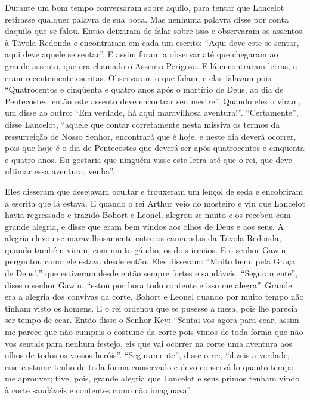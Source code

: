 Durante um bom tempo conversaram sobre aquilo, para tentar que Lancelot
retirasse qualquer palavra de sua boca. Mas nenhuma palavra disse por conta
daquilo que se falou. Então deixaram de falar sobre isso e observaram os
assentos à Távola Redonda e encontraram em cada um escrito: “Aqui deve este se
sentar, aqui deve aquele se sentar”. E assim foram a observar até que chegaram
ao grande assento, que era chamado o Assento Perigoso. E lá encontraram letras,
e eram recentemente escritas. Observaram o que falam, e elas falavam pois: 
“Quatrocentos e cinqüenta e quatro anos após o martírio de Deus, ao dia de
Pentecostes, então este assento deve encontrar seu mestre”. Quando eles o
viram, um disse ao outro: “Em verdade, há aqui maravilhosa aventura!”.
“Certamente”, disse Lancelot, “aquele que contar corretamente nesta missiva os
termos da ressurreição de Nosso Senhor, encontrará que é hoje, e neste dia
deverá ocorrer, pois que hoje é o dia de Pentecostes que deverá ser após
quatrocentos e cinqüenta e quatro anos. Eu gostaria que ninguém visse este
letra até que o rei, que deve ultimar essa aventura, venha”. 

Eles disseram que desejavam ocultar e trouxeram um lençol de seda e encobriram a
escrita que lá estava. E quando o rei Arthur veio do mosteiro e viu que
Lancelot havia regressado e trazido Bohort e Leonel, alegrou-se muito e os
recebeu com grande alegria, e disse que eram bem vindos aos olhos de Deus e aos
seus. A alegria elevou-se maravilhosamente entre os camaradas da Távola
Redonda, quando também viram, com muito gáudio, os dois irmãos. E o senhor
Gawin perguntou como ele estava desde então. Eles disseram: “Muito bem, pela
Graça de Deus!,” que estiveram desde então sempre fortes e saudáveis.
“Seguramente”, disse o senhor Gawin, “estou por hora todo contente e isso me
alegra”. Grande era a alegria dos convivas da corte, Bohort e Leonel quando por
muito tempo não tinham visto os homens. E o rei ordenou que se pusesse a mesa,
pois lhe parecia ser tempo de cear. Então disse o Senhor Key: “Sentai-vos agora
para cear, assim me parece que não cumpris o costume da corte pois vimos de
toda forma que não vos sentais para nenhum festejo, eis que vai ocorrer na
corte uma aventura aos olhos de todos os vossos heróis”. “Seguramente”, disse o
rei, “dizeis a verdade, esse costume tenho de toda forma conservado e devo
conservá-lo quanto tempo me aprouver; tive, pois, grande alegria que Lancelot
e seus primos tenham vindo à corte saudáveis e contentes como não imaginava”. 

